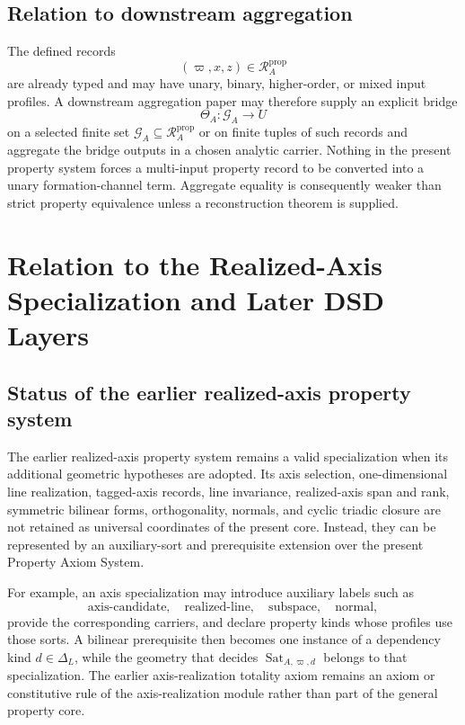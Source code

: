 \documentclass[11pt]{article}
\newcommand{\Dep}{\Delta_{L}}
\newcommand{\Sat}{\operatorname{Sat}}
\newcommand{\PropRec}{\mathcal R^{\mathrm{prop}}}
\theoremstyle{definition}
\theoremstyle{remark}
\begin{document}
\subsection{Relation to downstream aggregation}

The defined records
\[
(\varpi,x,z)\in\PropRec_A
\]
are already typed and may have unary, binary, higher-order, or mixed input profiles.
A downstream aggregation paper may therefore supply an explicit bridge
\[
\Theta_A:\mathcal G_A\longrightarrow U
\]
on a selected finite set \(\mathcal G_A\subseteq\PropRec_A\) or on finite tuples of such records and aggregate the bridge outputs in a chosen analytic carrier.
Nothing in the present property system forces a multi-input property record to be converted into a unary formation-channel term.
Aggregate equality is consequently weaker than strict property equivalence unless a reconstruction theorem is supplied.

\section{Relation to the Realized-Axis Specialization and Later DSD Layers}
\label{sec:specialization}

\subsection{Status of the earlier realized-axis property system}

The earlier realized-axis property system \cite{KwonAxisProperty} remains a valid specialization when its additional geometric hypotheses are adopted.
Its axis selection, one-dimensional line realization, tagged-axis records, line invariance, realized-axis span and rank, symmetric bilinear forms, orthogonality, normals, and cyclic triadic closure are not retained as universal coordinates of the present core.
Instead, they can be represented by an auxiliary-sort and prerequisite extension over the present Property Axiom System.

For example, an axis specialization may introduce auxiliary labels such as
\[
\mathrm{axis\mbox{-}candidate},\quad
\mathrm{realized\mbox{-}line},\quad
\mathrm{subspace},\quad
\mathrm{normal},
\]
provide the corresponding carriers, and declare property kinds whose profiles use those sorts.
A bilinear prerequisite then becomes one instance of a dependency kind \(d\in\Dep\), while the geometry that decides \(\Sat_{A,\varpi,d}\) belongs to that specialization.
The earlier axis-realization totality axiom remains an axiom or constitutive rule of the axis-realization module rather than part of the general property core.
\end{document}
